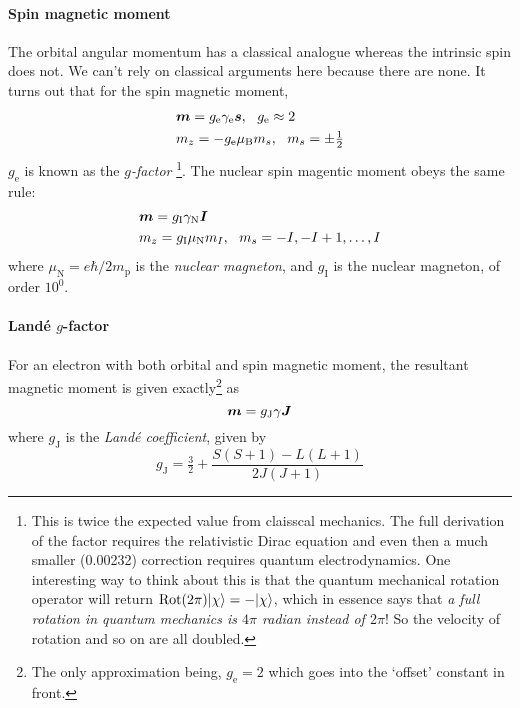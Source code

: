 \paragraph{Spin magnetic moment}
The orbital angular momentum has a classical analogue whereas the intrinsic spin does not. We can't rely on classical arguments here because there are none. It turns out that for the spin magnetic moment, 
\begin{equation}
\begin{aligned}
	&\bvec{m}=g_{\mathrm{e}}\gamma_{\mathrm{e}}\bvec{s},\ \ g_{\mathrm{e}}\approx2\\
	&m_z=-g_{\mathrm{e}}\mu_{\mathrm{B}}m_s,\ \ m_s=\pm\tfrac{1}{2}
\end{aligned}
\end{equation}
$g_{\mathrm{e}}$ is known as the \emph{$g$-factor}
\footnote{This is twice the expected value from claisscal mechanics. The full derivation of the factor requires the relativistic Dirac equation and even then a much smaller (0.00232) correction requires quantum electrodynamics. One interesting way to think about this is that the quantum mechanical rotation operator will return $\text{Rot}(2\pi)|\chi\rangle=-|\chi\rangle$, which in essence says that \emph{a full rotation in quantum mechanics is $4\pi$ radian instead of $2\pi$}! So the velocity of rotation and so on are all doubled.}.
The nuclear spin magentic moment obeys the same rule:
\begin{equation}
\begin{aligned}
	&\boldsymbol{m}=g_{\mathrm{I}}\gamma_{\mathrm{N}}\boldsymbol{I}\\
	&m_z=g_{\mathrm{I}}\mu_{\mathrm{N}}m_I,\ \ m_s=-I,-I+1,\dots,I
\end{aligned}
\end{equation}
where $\mu_{\mathrm{N}}=e\hbar/2m_{\mathrm{p}}$ is the \emph{nuclear magneton}, and $g_{\mathrm{I}}$ is the nuclear magneton, of order $10^0$.
\paragraph{Land{\'e} $g$-factor}
For an electron with both orbital and spin magnetic moment, the resultant magnetic moment is given exactly\footnote{The only approximation being, $g_{\mathrm{e}}=2$ which goes into the `offset' constant in front.} as
\begin{equation}
	\boldsymbol{m}=g_{\mathrm{J}}\gamma\boldsymbol{J}
\end{equation}
where $g_{\mathrm{J}}$ is the \emph{Land{\'e} coefficient}, given by
\begin{equation}
	g_{\mathrm{J}}=\tfrac{3}{2}+\frac{S(S+1)-L(L+1)}{2J(J+1)}
\end{equation}
